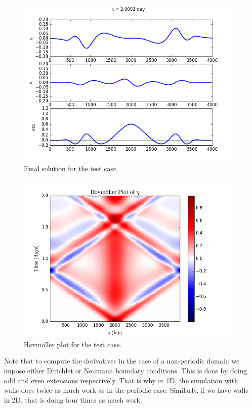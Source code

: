 \documentclass[letterpaper,10pt,english]{sphinxmanual}
\begin{document}
\begin{figure}[htbp]
\centering
\capstart

\includegraphics{ex1_fig1.png}
\caption{Final solution for the test case.}\end{figure}
\begin{figure}[htbp]
\centering
\capstart

\includegraphics{ex1_fig2.png}
\caption{Hovmöller plot for the test case.}\end{figure}

Note that to compute the derivatives in the case of a non-periodic
domain we impose either Dirichlet or Neumann boundary conditions. This
is done by doing odd and even extensions respectively. That is why in
1D, the simulation with walls does twice as much work as in the periodic
case. Similarly, if we have walls in 2D, that is doing four times as
much work.
\end{document}
